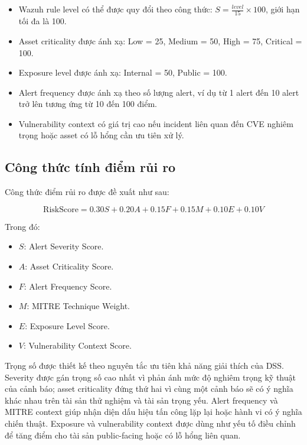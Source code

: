 \documentclass[a4paper,12pt,oneside]{book}
\begin{document}
{{\begin{itemize}
    \item Wazuh rule level có thể được quy đổi theo công thức: \(S = \frac{level}{15} \times 100\), giới hạn tối đa là 100.
    \item Asset criticality được ánh xạ: Low = 25, Medium = 50, High = 75, Critical = 100.
    \item Exposure level được ánh xạ: Internal = 50, Public = 100.
    \item Alert frequency được ánh xạ theo số lượng alert, ví dụ từ 1 alert đến 10 alert trở lên tương ứng từ 10 đến 100 điểm.
    \item Vulnerability context có giá trị cao nếu incident liên quan đến CVE nghiêm trọng hoặc asset có lỗ hổng cần ưu tiên xử lý.
\end{itemize}

}

\subsection{Công thức tính điểm rủi ro}
{\fontsize{13pt}{15.6pt}\selectfont

Công thức điểm rủi ro được đề xuất như sau:

\[
\mathrm{RiskScore} = 0.30S + 0.20A + 0.15F + 0.15M + 0.10E + 0.10V
\]

\noindent Trong đó:

\begin{itemize}
    \item \(S\): Alert Severity Score.
    \item \(A\): Asset Criticality Score.
    \item \(F\): Alert Frequency Score.
    \item \(M\): MITRE Technique Weight.
    \item \(E\): Exposure Level Score.
    \item \(V\): Vulnerability Context Score.
\end{itemize}

\noindent Trọng số được thiết kế theo nguyên tắc ưu tiên khả năng giải thích của DSS. Severity được gán trọng số cao nhất vì phản ánh mức độ nghiêm trọng kỹ thuật của cảnh báo; asset criticality đứng thứ hai vì cùng một cảnh báo sẽ có ý nghĩa khác nhau trên tài sản thử nghiệm và tài sản trọng yếu. Alert frequency và MITRE context giúp nhận diện dấu hiệu tấn công lặp lại hoặc hành vi có ý nghĩa chiến thuật. Exposure và vulnerability context được dùng như yếu tố điều chỉnh để tăng điểm cho tài sản public-facing hoặc có lỗ hổng liên quan.

}}
\end{document}
